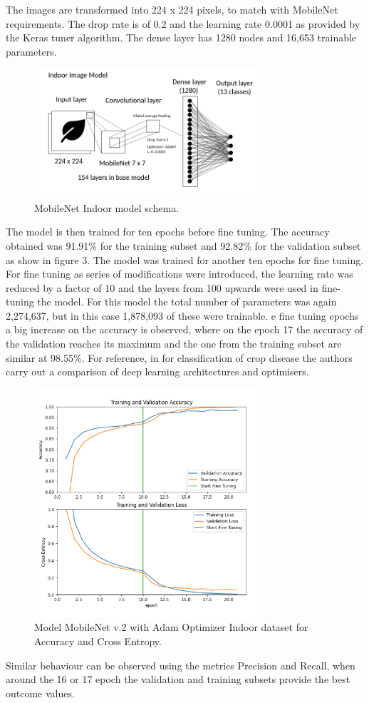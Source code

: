 \documentclass[conference]{IEEEtran}
\begin{document}
The images are transformed into 224 x 224 pixels, to match with MobileNet requirements. The drop rate is of 0.2 and the learning rate 0.0001 as provided by the Keras tuner algorithm. The dense layer has 1280 nodes and 16,653 trainable parameters. \
\begin{figure}[htbp]
\centerline{\includegraphics[width=8.5cm]{ModelIndoorsMobileNet.png}}
\caption{MobileNet Indoor model schema.}
\label{fig}
\end{figure}
The model is then trained for ten epochs before fine tuning. The accuracy obtained was 91.91\% for the training subset and 92.82\% for the validation subset as show in figure 3. The model was trained for another ten epochs for fine tuning. For fine tuning as series of modifications were introduced, the learning rate was reduced by a factor of 10 and the layers from 100 upwards were used in fine-tuning the model. For this model the total number of parameters was again 2,274,637, but in this case 1,878,093 of these were trainable. e fine tuning epochs a big increase on the accuracy is observed, where on the epoch 17 the accuracy of the validation reaches its maximum and the one from the training subset are similar at 98.55\%. For reference, in \cite{saleem2020plant} for classification of crop disease the authors carry out a comparison of deep learning architectures and optimisers. 
    
\begin{figure}[htbp]
\centerline{\includegraphics[width=8.5cm]{ModelIndoorsMobileNetEpochsAccuracychart.png}}
\caption{Model MobileNet v.2 with Adam Optimizer Indoor dataset for Accuracy and Cross Entropy.}
\label{fig}
\end{figure}
Similar behaviour can be observed using the metrics Precision and Recall, when around the 16 or 17 epoch the validation and training subsets provide the best outcome values. 
\end{document}
